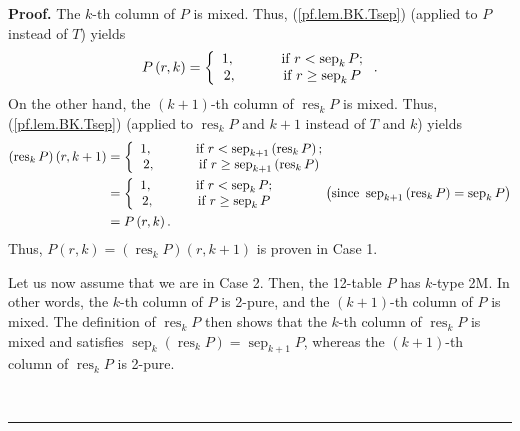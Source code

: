 \documentclass[numbers=enddot,12pt,final,onecolumn,notitlepage]{scrartcl}%
\theoremstyle{definition}
\newenvironment{proof}[1][Proof]{\noindent\textbf{#1.} }{\ \rule{0.5em}{0.5em}}
\newenvironment{verlong}{}{}
\begin{document}
\begin{verlong}
\begin{proof}
The $k$-th column of $P$ is mixed. Thus, (\ref{pf.lem.BK.Tsep}) (applied to
$P$ instead of $T$) yields%
\[
P\left(  r,k\right)  =\left\{
\begin{array}
[c]{c}%
1,\ \ \ \ \ \ \ \ \ \ \text{if }r<\operatorname*{sep}\nolimits_{k}P;\\
2,\ \ \ \ \ \ \ \ \ \ \text{if }r\geq\operatorname*{sep}\nolimits_{k}P
\end{array}
\right.  .
\]
On the other hand, the $\left(  k+1\right)  $-th column of
$\operatorname*{res}\nolimits_{k}P$ is mixed. Thus, (\ref{pf.lem.BK.Tsep})
(applied to $\operatorname*{res}\nolimits_{k}P$ and $k+1$ instead of $T$ and
$k$) yields%
\begin{align*}
\left(  \operatorname*{res}\nolimits_{k}P\right)  \left(  r,k+1\right)   &
=\left\{
\begin{array}
[c]{c}%
1,\ \ \ \ \ \ \ \ \ \ \text{if }r<\operatorname*{sep}\nolimits_{k+1}\left(
\operatorname*{res}\nolimits_{k}P\right)  ;\\
2,\ \ \ \ \ \ \ \ \ \ \text{if }r\geq\operatorname*{sep}\nolimits_{k+1}\left(
\operatorname*{res}\nolimits_{k}P\right)
\end{array}
\right. \\
&  =\left\{
\begin{array}
[c]{c}%
1,\ \ \ \ \ \ \ \ \ \ \text{if }r<\operatorname*{sep}\nolimits_{k}P;\\
2,\ \ \ \ \ \ \ \ \ \ \text{if }r\geq\operatorname*{sep}\nolimits_{k}P
\end{array}
\right.  \ \ \ \ \ \ \ \ \ \ \left(  \text{since }\operatorname*{sep}%
\nolimits_{k+1}\left(  \operatorname*{res}\nolimits_{k}P\right)
=\operatorname*{sep}\nolimits_{k}P\right) \\
&  =P\left(  r,k\right)  .
\end{align*}
Thus, $P\left(  r,k\right)  =\left(  \operatorname*{res}\nolimits_{k}P\right)
\left(  r,k+1\right)  $ is proven in Case 1.

Let us now assume that we are in Case 2. Then, the 12-table $P$ has $k$-type
2M. In other words, the $k$-th column of $P$ is 2-pure, and the $\left(
k+1\right)  $-th column of $P$ is mixed. The definition of
$\operatorname*{res}\nolimits_{k}P$ then shows that the $k$-th column of
$\operatorname*{res}_{k}P$ is mixed and satisfies $\operatorname*{sep}%
\nolimits_{k}\left(  \operatorname*{res}\nolimits_{k}P\right)
=\operatorname*{sep}\nolimits_{k+1}P$, whereas the $\left(  k+1\right)  $-th
column of $\operatorname*{res}\nolimits_{k}P$ is 2-pure.


\end{proof}
\end{verlong}
\end{document}
